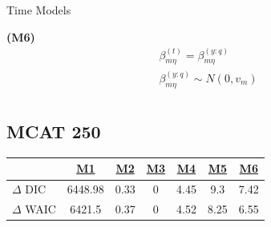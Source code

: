 \documentclass[ xcolor = pdftex, dvipsnames, table ]{beamer}
\begin{document}
\begin{frame}{Time Models}
\begin{minipage}{0.3\textwidth}
\begin{center}
\textbf{(M6)}
\begin{eqnarray*}
&\beta^{(t)}_{m\eta} = \beta^{(y:q)}_{m\eta}&\\
&\beta^{(y:q)}_{m\eta} \sim N(0, v_m)&\\
&&
\end{eqnarray*}
\end{center}
\end{minipage}
\end{frame}

%
%

\subsection{MCAT 250}
\begin{frame}{}
	\begin{table}[ht!]
        \centering
        \begin{tabular}[c]{@{}lcccccc@{}}
        \hline
        & \href{https://github.com/gasduster99/sppComp/tree/master/sscRuns/25019781982M1}{M1} & \href{https://github.com/gasduster99/sppComp/tree/master/sscRuns/25019781982M2}{M2} & \href{https://github.com/gasduster99/sppComp/tree/master/sscRuns/25019781982M3}{M3} & \href{https://github.com/gasduster99/sppComp/tree/master/sscRuns/25019781982M4}{M4} & \href{https://github.com/gasduster99/sppComp/tree/master/sscRuns/25019781982M5}{M5} & \href{https://github.com/gasduster99/sppComp/tree/master/sscRuns/25019781982M6}{M6} \\ \hline
        \(\Delta\) DIC & 6448.98 & 0.33 & 0 & 4.45 & 9.3 & 7.42 \\
        \(\Delta\) WAIC & 6421.5 & 0.37 & 0 & 4.52 & 8.25 & 6.55 \\ \hline
        \end{tabular}
        \end{table}
\end{frame}

%
%
\end{document}
